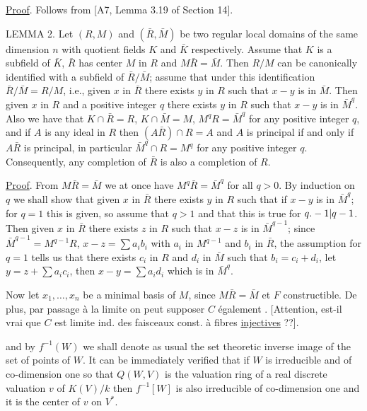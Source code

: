\uline{Proof}. Follows from [A7, Lemma 3.19 of Section 14].

LEMMA 2. Let $(R,M)$ and $(\bar R,\bar M)$ be two regular local domains of the same dimension $n$ with quotient fields $K$ and $\bar K$ respectively. Assume that $K$ is a subfield of $\bar K$, $\bar R$ has center $M$ in $R$ and $M\bar R=\bar M$. Then $R/M$ can be canonically identified with a subfield of $\bar R/\bar M$; assume that under this identification $\bar R/\bar M=R/M$, i.e., given $x$ in $\bar R$ there exists $y$ in $R$ such that $x-y$ is in $\bar M$. Then given $x$ in $R$ and a positive integer $q$ there exists $y$ in $R$ such that $x-y$ is in $\bar M^q$. Also we have that $K\cap\bar R=R$, $K\cap\bar M=M$, $M^qR=\bar M^q$ for any positive integer $q$, and if $A$ is any ideal in $R$ then $(A\bar R)\cap R=A$ and $A$ is principal if and only if $A\bar R$ is principal, in particular $\bar M^q\cap R=M^q$ for any positive integer $q$. Consequently, any completion of $\bar R$ is also a completion of $R$.

\uline{Proof}. From $M\bar R=\bar M$ we at once have $M^q\bar R=\bar M^q$ for all $q>0$. By induction on $q$ we shall show that given $x$ in $\bar R$ there exists $y$ in $R$ such that if $x-y$ is in $\bar M^q$; for $q=1$ this is given, so assume that $q>1$ and that this is true for ${q.-1|q-1}$. Then given $x$ in $\bar R$ there exists $z$ in $R$ such that $x-z$ is in $\bar M^{q-1}$; since $\bar M^{q-1}=M^{q-1}R$, $x-z=\sum a_ib_i$ with $a_i$ in $M^{q-1}$ and $b_i$ in $\bar R$, the assumption for $q=1$ tells us that there exists $c_i$ in $R$ and $d_i$ in $\bar M$ such that $b_i=c_i+d_i$, let $y=z+\sum a_ic_i$, then $x-y=\sum a_id_i$ which is in $\bar M^q$.

Now let $x_1,\ldots,x_n$ be a minimal basis of $M$, since $M\bar R=\bar M$
et $F$ constructible. De plus, par passage à la limite on peut supposer  $C$ également . [Attention, est-il vrai que $C$ est limite ind.  des  faisceaux const. à fibres \uline{injectives} ??].

and by $f^{-1}(W)$ we shall denote as usual the set theoretic inverse image of the set of points of $W$. It can be immediately verified that if $W$ is irreducible and of co-dimension one so that $Q(W,V)$ is the valuation ring of a real discrete valuation $v$ of $K(V)/k$ then $f^{-1}[W]$ is also irreducible of co-dimension one and it is the center of $v$ on $V^*$.

